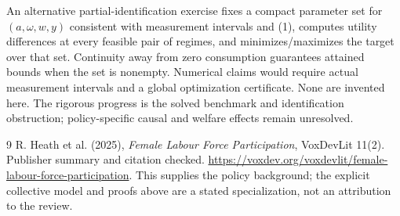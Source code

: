 \documentclass[11pt]{article}
\theoremstyle{definition}
\begin{document}
An alternative partial-identification exercise fixes a compact parameter set
for $(a,\omega,w,y)$ consistent with measurement intervals and (1), computes
utility differences at every feasible pair of regimes, and minimizes/maximizes
the target over that set. Continuity away from zero consumption guarantees
attained bounds when the set is nonempty. Numerical claims would require actual
measurement intervals and a global optimization certificate. None are invented
here. The rigorous progress is the solved benchmark and identification obstruction;
policy-specific causal and welfare effects remain unresolved.
\begin{thebibliography}{9}
 R. Heath et al. (2025), \emph{Female Labour Force Participation},
VoxDevLit 11(2). Publisher summary and citation checked.
\url{https://voxdev.org/voxdevlit/female-labour-force-participation}.
This supplies the policy background; the explicit collective model and proofs
above are a stated specialization, not an attribution to the review.
\end{thebibliography}
\end{document}
